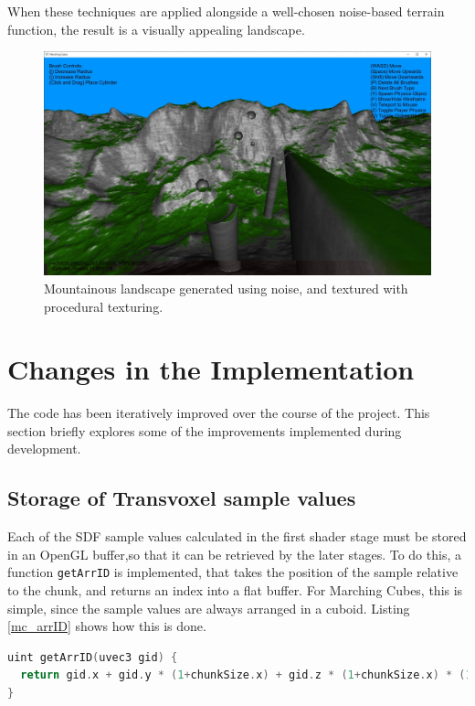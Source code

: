 \documentclass[11pt]{article}
\begin{document}
When these techniques are applied alongside a well-chosen noise-based terrain function, the result is a visually appealing landscape.
\begin{figure}[H]
  \includegraphics[width=\textwidth]{shaded_mountains.jpg}
  \caption{Mountainous landscape generated using noise, and textured with procedural texturing. }
  \label{fig:shaded_mountainsd}
\end{figure}


\section{Changes in the Implementation}
The code has been iteratively improved over the course of the project. This section briefly explores some of the improvements implemented during development.

\subsection{Storage of Transvoxel sample values}
Each of the SDF sample values calculated in the first shader stage must be stored in an OpenGL buffer,so that it can be retrieved by the later stages. To do this, a function \texttt{getArrID} is implemented, that takes the position of the sample relative to the chunk, and returns an index into a flat buffer. For Marching Cubes, this is simple, since the sample values are always arranged in a cuboid. Listing \ref{mc_arrID} shows how this is done.
\begin{lstlisting}[language=C++,label={mc_arrID},caption={Function mapping grid position \texttt{gid} to flat array id}]
uint getArrID(uvec3 gid) {
  return gid.x + gid.y * (1+chunkSize.x) + gid.z * (1+chunkSize.x) * (1+chunkSize.y);
}
\end{lstlisting}
\end{document}
